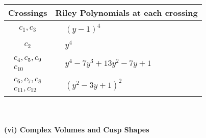 \documentclass[1p]{elsarticle_modified}
\theoremstyle{definition}
\begin{document}
\begin{tabular}{m{50pt}|m{274pt}}
Crossings & \hspace{64pt}Riley Polynomials at each crossing \\
\hline $$\begin{aligned}c_{1},c_{3}\end{aligned}$$&$\begin{aligned}
&(y-1)^4
\end{aligned}$\\
\hline $$\begin{aligned}c_{2}\end{aligned}$$&$\begin{aligned}
&y^4
\end{aligned}$\\
\hline $$\begin{aligned}c_{4},c_{5},c_{9}\\c_{10}\end{aligned}$$&$\begin{aligned}
&y^4-7 y^3+13 y^2-7 y+1
\end{aligned}$\\
\hline $$\begin{aligned}c_{6},c_{7},c_{8}\\c_{11},c_{12}\end{aligned}$$&$\begin{aligned}
&(y^2-3 y+1)^2
\end{aligned}$\\
\hline
\end{tabular}\\~\\
\newpage\flushleft \textbf{(vi) Complex Volumes and Cusp Shapes}
\end{document}
